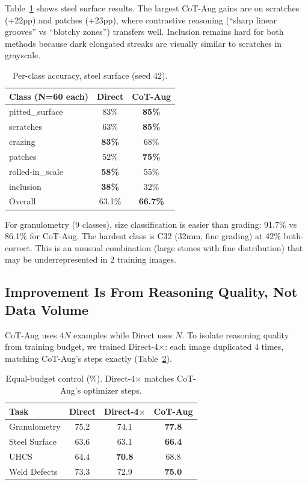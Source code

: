 \documentclass[11pt]{article}
\begin{document}
Table~\ref{tab:perclass_steel} shows steel surface results. The largest CoT-Aug gains are on scratches (+22pp) and patches (+23pp), where contrastive reasoning (``sharp linear grooves'' vs ``blotchy zones'') transfers well. Inclusion remains hard for both methods because dark elongated streaks are visually similar to scratches in grayscale.

\begin{table}[h]
\centering\small
\begin{tabular}{lcc}
\toprule
Class (N=60 each) & Direct & CoT-Aug \\
\midrule
pitted\_surface & 83\% & \textbf{85\%} \\
scratches & 63\% & \textbf{85\%} \\
crazing & \textbf{83\%} & 68\% \\
patches & 52\% & \textbf{75\%} \\
rolled-in\_scale & \textbf{58\%} & 55\% \\
inclusion & \textbf{38\%} & 32\% \\
\midrule
Overall & 63.1\% & \textbf{66.7\%} \\
\bottomrule
\end{tabular}
\caption{Per-class accuracy, steel surface (seed 42).}
\label{tab:perclass_steel}
\end{table}

For granulometry (9 classes), size classification is easier than grading: 91.7\% vs 86.1\% for CoT-Aug. The hardest class is C32 (32mm, fine grading) at 42\% both-correct. This is an unusual combination (large stones with fine distribution) that may be underrepresented in 2 training images.

\subsection{Improvement Is From Reasoning Quality, Not Data Volume}

CoT-Aug uses $4N$ examples while Direct uses $N$. To isolate reasoning quality from training budget, we trained Direct-4$\times$: each image duplicated 4 times, matching CoT-Aug's steps exactly (Table~\ref{tab:budget}).

\begin{table}[h]
\centering
\begin{tabular}{lccc}
\toprule
Task & Direct & Direct-4$\times$ & CoT-Aug \\
\midrule
Granulometry & 75.2 & 74.1 & \textbf{77.8} \\
Steel Surface & 63.6 & 63.1 & \textbf{66.4} \\
UHCS & 64.4 & \textbf{70.8} & 68.8 \\
Weld Defects & 73.3 & 72.9 & \textbf{75.0} \\
\bottomrule
\end{tabular}
\caption{Equal-budget control (\%). Direct-4$\times$ matches CoT-Aug's optimizer steps.}
\label{tab:budget}
\end{table}
\end{document}
